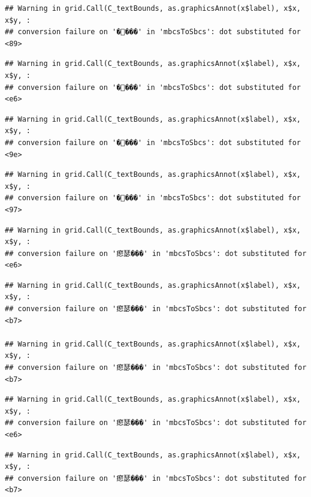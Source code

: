 \documentclass[
]{article}
\begin{document}
\begin{verbatim}
## Warning in grid.Call(C_textBounds, as.graphicsAnnot(x$label), x$x, x$y, :
## conversion failure on '����' in 'mbcsToSbcs': dot substituted for <89>
\end{verbatim}

\begin{verbatim}
## Warning in grid.Call(C_textBounds, as.graphicsAnnot(x$label), x$x, x$y, :
## conversion failure on '����' in 'mbcsToSbcs': dot substituted for <e6>
\end{verbatim}

\begin{verbatim}
## Warning in grid.Call(C_textBounds, as.graphicsAnnot(x$label), x$x, x$y, :
## conversion failure on '����' in 'mbcsToSbcs': dot substituted for <9e>
\end{verbatim}

\begin{verbatim}
## Warning in grid.Call(C_textBounds, as.graphicsAnnot(x$label), x$x, x$y, :
## conversion failure on '����' in 'mbcsToSbcs': dot substituted for <97>
\end{verbatim}

\begin{verbatim}
## Warning in grid.Call(C_textBounds, as.graphicsAnnot(x$label), x$x, x$y, :
## conversion failure on '瘛瑟���' in 'mbcsToSbcs': dot substituted for <e6>
\end{verbatim}

\begin{verbatim}
## Warning in grid.Call(C_textBounds, as.graphicsAnnot(x$label), x$x, x$y, :
## conversion failure on '瘛瑟���' in 'mbcsToSbcs': dot substituted for <b7>

## Warning in grid.Call(C_textBounds, as.graphicsAnnot(x$label), x$x, x$y, :
## conversion failure on '瘛瑟���' in 'mbcsToSbcs': dot substituted for <b7>
\end{verbatim}

\begin{verbatim}
## Warning in grid.Call(C_textBounds, as.graphicsAnnot(x$label), x$x, x$y, :
## conversion failure on '瘛瑟���' in 'mbcsToSbcs': dot substituted for <e6>
\end{verbatim}

\begin{verbatim}
## Warning in grid.Call(C_textBounds, as.graphicsAnnot(x$label), x$x, x$y, :
## conversion failure on '瘛瑟���' in 'mbcsToSbcs': dot substituted for <b7>
\end{verbatim}
\end{document}
